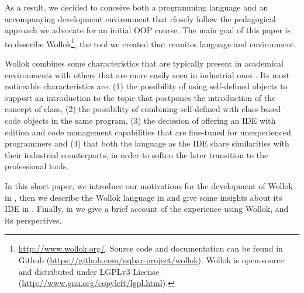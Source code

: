 As a result, we decided to conceive both a programming language and an accompanying development environment that  closely follow the pedagogical approach we advocate for an initial OOP course. 
The main goal of this paper is to describe Wollok\footnote{
	\url{http://www.wollok.org/}. 
	Source code and documentation can be found in Github 
	(\url{https://github.com/uqbar-project/wollok}).
	Wollok is open-source and distributed under LGPLv3 License 
	(\url{http://www.gnu.org/copyleft/lgpl.html}).}, 
the tool we created that reunites language and environment. 

\medskip
%

Wollok combines some characteristics that are typically present in academical environments with others that are more easily seen in industrial ones%
.
Its most noticeable characteristics are:
(1) the possibility of using self-defined objects to support an introduction to the topic that postpones the introduction of the concept of class,
(2) the possibility of combining self-defined with class-based code objects in the same program,
(3) the decission of offering an IDE with edition and code management capabilities that are fine-tuned for unexperienced programmers
and (4) that both the language as the IDE share similarities with their industrial counterparts, in order to soften the later transition to the professional tools.

\medskip 
In this short paper, we introduce our motivations for the development of Wollok in , then we describe the Wollok language in  and give some insights about its IDE in . Finally, in  we give a brief account of the experience using Wollok, and its perspectives.


